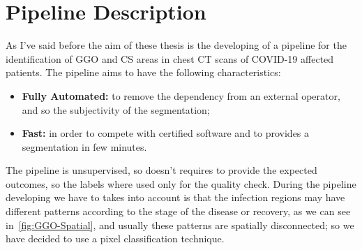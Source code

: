
	
	\section{Pipeline Description}
	
	As I've said before the aim of these thesis is the developing of a pipeline for the identification of GGO and CS areas in chest CT scans of COVID-19 affected patients. The pipeline aims to have the following characteristics:   
	\begin{itemize}
		\item  \textbf{Fully Automated: } to remove the dependency from an external operator, and so the subjectivity of the segmentation; 
		
		\item \textbf{Fast: } in order to compete with certified software and to provides a segmentation in few minutes.
	\end{itemize}

	The pipeline is unsupervised, so doesn't requires to provide the expected outcomes, so the labels where used only for the quality check. During the pipeline developing we have to takes into account is that the infection regions may have different patterns according to the stage of the disease or recovery, as we can see in \figurename\,\ref{fig:GGO-Spatial}, and usually these patterns are spatially disconnected; so we have decided to use a pixel classification technique.
	
	
